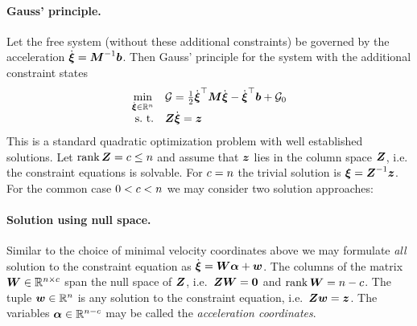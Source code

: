 \paragraph{Gauss' principle.}
Let the free system (without these additional constraints) be governed by the acceleration $\sysVeld = \sysInertiaMat^{-1}\sysForce$.
Then Gauss' principle for the system with the additional constraint states
\begin{align}\label{eq:GaussPrincipleAccConstraints}
 \begin{array}{rl}
  \minOp[\sysVeld\in\RealNum^{\dimConfigSpace}] & \GaussianConstraint = \tfrac{1}{2} \sysVeld^\top \sysInertiaMat \sysVeld - \sysVeld^\top \sysForce + \GaussianConstraint_0 \\
  \text{s.\ t.} & \accConstraintMat \sysVeld = \accConstraintB
 \end{array}
\end{align}
This is a standard quadratic optimization problem with well established solutions.
Let $\rank\accConstraintMat = c \leq \dimConfigSpace$ and assume that $\accConstraintB$ lies in the column space $\accConstraintMat$, i.e. the constraint equations is solvable.
For $c=\dimConfigSpace$ the trivial solution is $\sysVel = \accConstraintMat^{-1}\accConstraintB$.
For the common case $0 < c < \dimConfigSpace$ we may consider two solution approaches:

\paragraph{Solution using null space.}
Similar to the choice of minimal velocity coordinates above \fixme{[link]} we may formulate \textit{all} solution to the constraint equation as $\sysVeld = \mat{W}\tuple{\alpha} + \tuple{w}$.
The columns of the matrix $\mat{W}\in\RealNum^{\dimConfigSpace\times c}$ span the null space of $\accConstraintMat$, i.e.\ $\accConstraintMat \mat{W}=\mat{0}$ and $\rank\mat{W} = \dimConfigSpace-c$. 
The tuple $\tuple{w} \in \RealNum^\dimConfigSpace$ is any solution to the constraint equation, i.e.\ $\accConstraintMat\tuple{w} = \accConstraintB$.
The variables $\tuple{\alpha} \in \RealNum^{\dimConfigSpace-c}$ may be called the \textit{acceleration coordinates}.

